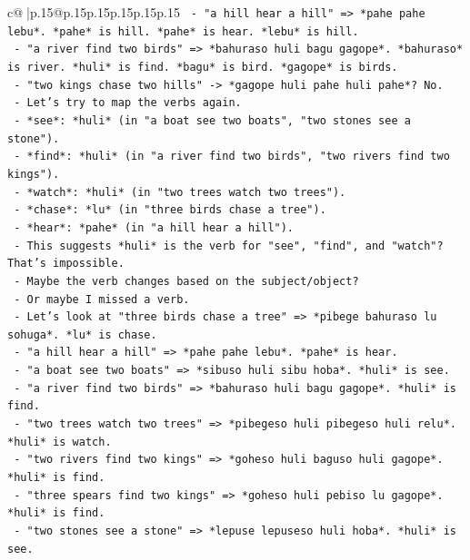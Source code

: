 \documentclass{article}
\begin{document}
{\begin{supertabular}{c@{$\;$}|p{.15\linewidth}@{}p{.15\linewidth}p{.15\linewidth}p{.15\linewidth}p{.15\linewidth}p{.15\linewidth}}
{{{\texttt{        {-} "a hill hear a hill" => *pahe pahe lebu*. *pahe* is hill. *pahe* is hear. *lebu* is hill.} \\
\texttt{        {-} "a river find two birds" => *bahuraso huli bagu gagope*. *bahuraso* is river. *huli* is find. *bagu* is bird. *gagope* is birds.} \\
\texttt{        {-} "two kings chase two hills" {-}> *gagope huli pahe huli pahe*? No.} \\
\texttt{        {-} Let's try to map the verbs again.} \\
\texttt{          {-} *see*: *huli* (in "a boat see two boats", "two stones see a stone").} \\
\texttt{          {-} *find*: *huli* (in "a river find two birds", "two rivers find two kings").} \\
\texttt{          {-} *watch*: *huli* (in "two trees watch two trees").} \\
\texttt{          {-} *chase*: *lu* (in "three birds chase a tree").} \\
\texttt{          {-} *hear*: *pahe* (in "a hill hear a hill").} \\
\texttt{          {-} This suggests *huli* is the verb for "see", "find", and "watch"? That's impossible.} \\
\texttt{          {-} Maybe the verb changes based on the subject/object?} \\
\texttt{          {-} Or maybe I missed a verb.} \\
\texttt{          {-} Let's look at "three birds chase a tree" => *pibege bahuraso lu sohuga*. *lu* is chase.} \\
\texttt{          {-} "a hill hear a hill" => *pahe pahe lebu*. *pahe* is hear.} \\
\texttt{          {-} "a boat see two boats" => *sibuso huli sibu hoba*. *huli* is see.} \\
\texttt{          {-} "a river find two birds" => *bahuraso huli bagu gagope*. *huli* is find.} \\
\texttt{          {-} "two trees watch two trees" => *pibegeso huli pibegeso huli relu*. *huli* is watch.} \\
\texttt{          {-} "two rivers find two kings" => *goheso huli baguso huli gagope*. *huli* is find.} \\
\texttt{          {-} "three spears find two kings" => *goheso huli pebiso lu gagope*. *huli* is find.} \\
\texttt{          {-} "two stones see a stone" => *lepuse lepuseso huli hoba*. *huli* is see.} \\
}}}
\end{supertabular}}
\end{document}
